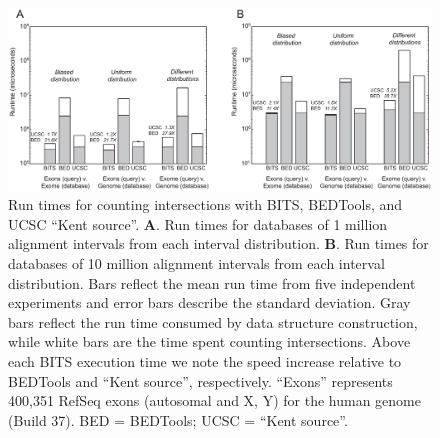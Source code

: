 \documentclass{bioinfo}
\begin{document}
\begin{figure}[btp]
	\centering
	\includegraphics[width=6.5in]{seq-counting.eps}
	\caption[]{Run times for counting intersections with 
	BITS, BEDTools, and UCSC ``Kent source''.  \textbf{A}. Run times for
databases of 1 million alignment intervals from each interval distribution.
	\textbf{B}.  Run times for databases of 10 million alignment intervals from
	each interval distribution.  Bars reflect the mean run
	time from five independent experiments and error bars describe the standard
	deviation.  Gray bars reflect the run time consumed by
	data structure construction, while white bars
	are the time spent counting intersections.  Above each BITS
	execution time we note the speed increase relative to BEDTools and 
	``Kent source'', respectively. ``Exons'' represents 400,351 RefSeq exons
	(autosomal and X, Y) for the human genome (Build 37).  BED = BEDTools; UCSC
	= ``Kent source''.}
	\label{seq-counting}
\end{figure}

%   
% 
        
\end{document}
